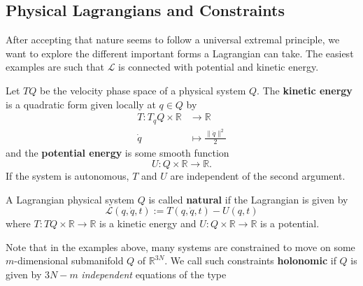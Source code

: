 \subsection*{Physical Lagrangians and Constraints}
After accepting that nature seems to follow a universal extremal principle, we want to explore the different important forms a Lagrangian can take. The easiest examples are such that $\mathcal{L}$ is connected with potential and kinetic energy.
\begin{definition}
    Let $TQ$ be the velocity phase space of a physical system $Q$. The \textbf{kinetic energy} is a quadratic form given locally at $q \in Q$ by
    \begin{align*}
        T: T_qQ  \times \mathbb{R} &\to \mathbb{R}\\
        \dot{q} &\mapsto \frac{\|\dot{q}\|^2}{2}
    \end{align*}
    and the \textbf{potential energy} is some smooth function
    \[
    U: Q \times \mathbb{R} \to \mathbb{R}
    .\] If the system is autonomous, $T$ and $U$ are independent of the second argument.
\end{definition}
\begin{definition}
    A Lagrangian physical system $Q$ is called \textbf{natural} if the Lagrangian is given by
    \[
        \mathcal{L}(q,\dot{q},t):=T(q,\dot{q},t) - U(q,t)
    \] where $T: TQ \times \mathbb{R} \to \mathbb{R}$ is a kinetic energy and $U: Q \times \mathbb{R} \to \mathbb{R}$ is a potential. 
\end{definition}
Note that in the examples above, many systems are constrained to move on some $m$-dimensional submanifold $Q$ of $\mathbb{R}^{3N}$. We call such constraints \textbf{holonomic} if $Q$ is given by $3N-m$ \emph{independent} equations of the type
